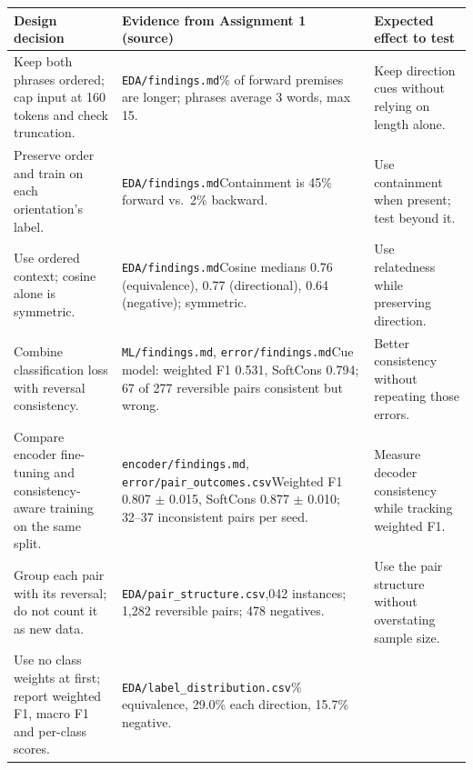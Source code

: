 \begin{table}[H]
\centering
\footnotesize
\setlength{\tabcolsep}{7pt}
\begin{tabular}{@{}L{0.26\textwidth}N{0.35\textwidth}L{0.29\textwidth}@{}}
\toprule
Design decision & Evidence from Assignment 1 (source) & Expected effect to test \\
\midrule
Keep both phrases ordered; cap input at 160 tokens and check truncation. &
\texttt{EDA/findings.md}\% of forward premises are longer; phrases average 3 words, max 15. &
Keep direction cues without relying on length alone. \\
\addlinespace[5pt]
Preserve order and train on each orientation's label. &
\texttt{EDA/findings.md}\newline Containment is 45\% forward vs.\ 2\% backward. &
Use containment when present; test beyond it. \\
\addlinespace[5pt]
Use ordered context; cosine alone is symmetric. &
\texttt{EDA/findings.md}\newline Cosine medians 0.76 (equivalence), 0.77 (directional), 0.64 (negative); symmetric. &
Use relatedness while preserving direction. \\
\addlinespace[5pt]
Combine classification loss with reversal consistency. &
\texttt{ML/findings.md}, \texttt{error/findings.md}\newline Cue model: weighted F1 0.531, SoftCons 0.794; 67 of 277 reversible pairs consistent but wrong. &
Better consistency without repeating those errors. \\
\addlinespace[5pt]
Compare encoder fine-tuning and consistency-aware training on the same split. &
\texttt{encoder/findings.md}, \texttt{error/pair\_outcomes.csv}\newline Weighted F1 0.807 $\pm$ 0.015, SoftCons 0.877 $\pm$ 0.010; 32--37 inconsistent pairs per seed. &
Measure decoder consistency while tracking weighted F1. \\
\addlinespace[5pt]
Group each pair with its reversal; do not count it as new data. &
\texttt{EDA/pair\_structure.csv},042 instances; 1,282 reversible pairs; 478 negatives. &
Use the pair structure without overstating sample size. \\
\addlinespace[5pt]
Use no class weights at first; report weighted F1, macro F1 and per-class scores. &
\texttt{EDA/label\_distribution.csv}\% equivalence, 29.0\% each direction, 15.7\% negative. &

\end{tabular}
\end{table}
